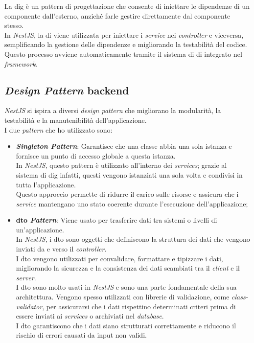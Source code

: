 \noindent La \gls{dig} è un pattern di progettazione che consente di iniettare le dipendenze di un componente dall'esterno, anziché farle gestire direttamente dal componente stesso. \\
In \textit{NestJS}, la \gls{di} viene utilizzata per iniettare i \textit{service} nei \textit{controller} e viceversa, semplificando la gestione delle dipendenze e migliorando la testabilità del codice. \\
Questo processo avviene automaticamente tramite il sistema di \gls{di} integrato nel \textit{framework}.

\pagebreak
\subsection*{\textit{Design Pattern} \gls{backend}}

\textit{NestJS} si ispira a diversi \textit{design pattern} che migliorano la modularità, la testabilità e la manutenibilità dell'applicazione.\\

\noindent I due \textit{pattern} che ho utilizzato sono:
\begin{itemize}
    \item \textbf{\textit{Singleton Pattern}}: Garantisce che una classe abbia una sola istanza e fornisce un punto di accesso globale a questa istanza.\\
    In \textit{NestJS}, questo pattern è utilizzato all'interno dei \textit{services};
    grazie al sistema di \gls{dig} infatti, questi vengono istanziati una sola volta e condivisi in tutta l'applicazione.\\
    Questo approccio permette di ridurre il carico sulle risorse e assicura che i \textit{service} mantengano uno stato coerente durante l'esecuzione dell'applicazione;
    \item \textbf{\gls{dto} \textit{Pattern}}: Viene usato per trasferire dati tra sistemi o livelli di un'applicazione.\\
    In \textit{NestJS}, i \gls{dto} sono oggetti che definiscono la struttura dei dati che vengono inviati da e verso il \textit{controller}.\\
    I \gls{dto} vengono utilizzati per convalidare, formattare e tipizzare i dati, migliorando la sicurezza e la consistenza dei dati scambiati tra il \textit{client} e il \textit{server}. \\
    I \gls{dto} sono molto usati in \textit{NestJS} e sono una parte fondamentale della sua architettura. Vengono spesso utilizzati con librerie di validazione, come \textit{class-validator}, per assicurarsi che i dati rispettino determinati criteri prima di essere inviati ai \textit{services} o archiviati nel \textit{database}.\\
    I \gls{dto} garantiscono che i dati siano strutturati correttamente e riducono il rischio di errori causati da input non validi.    
\end{itemize}
